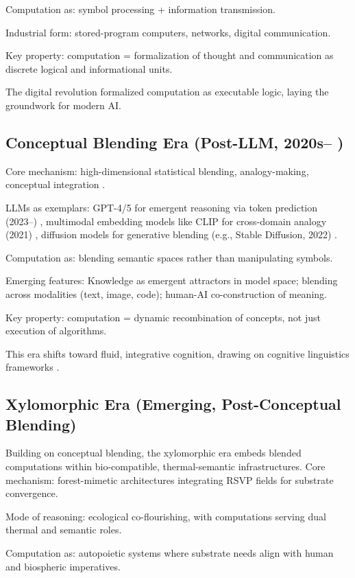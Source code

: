 \documentclass[12pt]{article}
\begin{document}
Computation as: symbol processing + information transmission.

Industrial form: stored-program computers, networks, digital communication.

Key property: computation = formalization of thought and communication as discrete logical and informational units.

The digital revolution formalized computation as executable logic, laying the groundwork for modern AI.

\subsection{Conceptual Blending Era (Post-LLM, 2020s– )}

Core mechanism: high-dimensional statistical blending, analogy-making, conceptual integration \citep{FauconnierTurner2002}.

LLMs as exemplars: GPT-4/5 for emergent reasoning via token prediction (2023–) \citep{OpenAI2023}, multimodal embedding models like CLIP for cross-domain analogy (2021) \citep{Radford2021}, diffusion models for generative blending (e.g., Stable Diffusion, 2022) \citep{Rombach2022}.

Computation as: blending semantic spaces rather than manipulating symbols.

Emerging features: Knowledge as emergent attractors in model space; blending across modalities (text, image, code); human-AI co-construction of meaning.

Key property: computation = dynamic recombination of concepts, not just execution of algorithms.

This era shifts toward fluid, integrative cognition, drawing on cognitive linguistics frameworks \citep{FauconnierTurner2002}.

\subsection{Xylomorphic Era (Emerging, Post-Conceptual Blending)}

Building on conceptual blending, the xylomorphic era embeds blended computations within bio-compatible, thermal-semantic infrastructures. Core mechanism: forest-mimetic architectures integrating RSVP fields for substrate convergence.

Mode of reasoning: ecological co-flourishing, with computations serving dual thermal and semantic roles.

Computation as: autopoietic systems where substrate needs align with human and biospheric imperatives.
\end{document}
